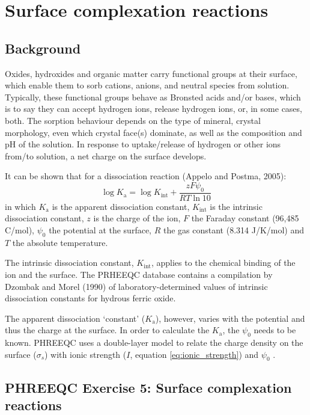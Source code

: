 \chapter{Surface complexation reactions}
\def\shorttitle{Surface complexation reactions} %

\section{Background}


Oxides, hydroxides and organic matter carry functional groups at their surface, 
which  enable them to sorb cations, anions, and neutral species from solution.  
Typically, these functional groups behave as Bronsted acids and/or bases, 
which is to say they can accept hydrogen ions, release hydrogen ions, or, 
in some cases, both. The sorption behaviour depends on the type 
of mineral, crystal morphology, even which crystal face(s) dominate, 
as well as the composition and pH of the solution.
In response to uptake/release of hydrogen or other ions from/to solution, 
a net charge on the surface develops.

It can be shown that for a dissociation reaction (Appelo and Postma, 2005):
\begin{equation}
\log K_{\text{a}} = \log K_{\text{int}} + \frac{zF\psi_0}{RT \ln 10}
\end{equation}
in which $K_{\text{a}}$ is the apparent dissociation constant, $K_{\text{int}}$ is the intrinsic dissociation constant, $z$ is the charge of the ion, $F$ the Faraday constant (96,485 C/mol), $\psi_0$ the potential at the surface, $R$ the gas constant (8.314 J/K/mol) and $T$ the absolute temperature.

The intrinsic dissociation constant, $K_{\text{int}}$, applies to the chemical binding of the ion and the surface. The PRHEEQC database contains a compilation by Dzombak and Morel (1990) of laboratory-determined values of intrinsic dissociation constants for hydrous ferric oxide.

The apparent dissociation `constant' ($K_{\text{a}}$), however, varies with the potential and thus the charge at the surface. In order to calculate the $K_{\text{a}}$, the $\psi_0$ needs to be known. PHREEQC uses a double-layer model to relate the charge density on the surface ($\sigma_s$) with ionic strength ($I$, equation \ref{eq:ionic_strength}) and $\psi_0$ \citep{phreeqc2}.

\section{PHREEQC Exercise 5: Surface complexation reactions}
